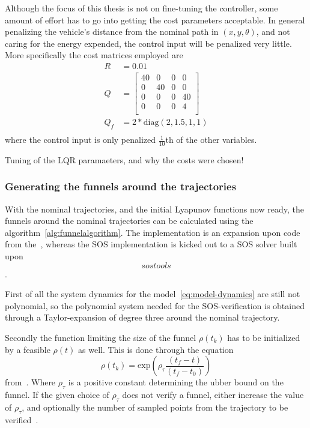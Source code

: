 Although the focus of this thesis is not on fine-tuning the controller, some
amount of effort has to go into getting the cost parameters acceptable. In
general penalizing the vehicle's distance from the nominal path in
\((x,y,\theta)\), and not caring for the energy expended, the control input will
be penalized very little. More specifically the cost matrices employed are
\begin{align*}
  R &= 0.01 \\
  Q &= \begin{bmatrix}
    40 & 0 & 0 & 0 \\
    0 & 40 & 0 & 0 \\
    0 & 0 & 0 & 40 \\
    0 & 0 & 0 & 4 \\
  \end{bmatrix}
  \\
  Q_{f} &= 2*\mathrm{diag}(2, 1.5, 1, 1) \\
\end{align*}
where the control input is only penalized \(\frac{1}{10}\)th of the other variables.

Tuning of the LQR paramaeters, and why the costs were chosen!

\subsubsection{Generating the funnels around the trajectories}

With the nominal trajectories, and the initial Lyapunov functions now ready, the
funnels around the nominal trajectories can be calculated using the
algorithm~\ref{alg:funnelalgorithm}. The implementation is an expansion upon
code from the~\cite[Drake toolbox]{drake}, whereas the \ac{SOS} implementation
is kicked out to a \ac{SOS} solver built upon~\[sostools\]\cite{sostools}.

First of all the system dynamics for the model~\ref{eq:model-dynamics} are still
not polynomial, so the polynomial system needed for the \ac{SOS}-verification is
obtained through a Taylor-expansion of degree three around the nominal
trajectory.

Secondly the function limiting the size of the funnel \(\rho(t_{k})\) has to be
initialized by a feasible \(\rho(t)\) as well. This is done through the equation
\begin{equation}
  \rho(t_{k}) = \mathrm{exp}\left( \rho_{\tau}\frac{\left( t_{f} - t \right)}{\left( t_{f} - t_{0}  \right)}\right)
\end{equation}
from~\cite[eq.~6.sec~3]{tobenkinInvariantFunnelsTrajectories2010}. Where
\(\rho_{\tau}\) is a positive constant determining the ubber bound on the
funnel. If the given choice of \(\rho_{\tau}\) does not verify a funnel, either
increase the value of \(\rho_{\tau}\), and optionally the number of sampled
points from the trajectory to be
verified~\cite{tobenkinInvariantFunnelsTrajectories2010}.

